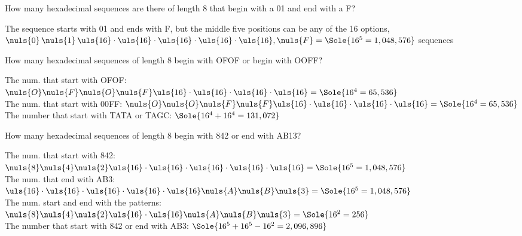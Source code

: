\begin{questions}
 How many hexadecimal sequences are there of length 8 that begin with a 01 and end with a F?
    \ifprintanswers
        \vspace{-10pt}
   \fi
    \begin{solution}
    The sequence starts with 01 and ends with F, but the middle five positions can be any of the 16 options,
    $ \nuls{0}\, \nuls{1}\, \uls{16} \cdot \uls{16} \cdot 
      \uls{16} \cdot \uls{16} \cdot \uls{16}, \nuls{F} =  
      \Sole{ 16^{5} = 1,048,576 } $ sequences
    \end{solution}



 How many hexadecimal sequences of length 8 begin with OFOF or begin with OOFF?
    \ifprintanswers
        \vspace{-15pt}
    \fi
    \begin{solution}
    The num. that start with OFOF: 
    $ \nuls{O} \nuls{F} \nuls{O} \nuls{F} 
      \uls{16} \cdot \uls{16} \cdot \uls{16} \cdot \uls{16} = 
      \Sole{ 16^4 = 65,536 }$ \\
    The num. that start with 00FF: 
    $\nuls{O} \nuls{O} \nuls{F} \nuls{F} 
      \uls{16} \cdot \uls{16} \cdot \uls{16} \cdot \uls{16} = 
      \Sole{  16^4 = 65,536 }$ \\[3pt]
    The number that start with TATA or TAGC: 
    $ \Sole{ 16^4 + 16^4 = 131,072 }$
    \end{solution}



 How many hexadecimal sequences of length 8 begin with 842 or end with AB13?
    \ifprintanswers
        \vspace{-10pt}
   \fi
    \begin{solution}
    The num. that start with 842: 
    $ \nuls{8} \nuls{4} \nuls{2} \uls{16} \cdot 
      \uls{16} \cdot \uls{16} \cdot \uls{16} \cdot \uls{16}
       = \Sole{ 16^5 = 1,048,576 }$ \\
    The num. that end with AB3: 
    $\uls{16} \cdot \uls{16} \cdot \uls{16} \cdot \uls{16} \cdot
     \uls{16} \nuls{A} \nuls{B} \nuls{3} 
       = \Sole{ 16^5 = 1,048,576 }$ \\
    The num. start and end with the patterns: 
    $ \nuls{8} \nuls{4} \nuls{2} \uls{16} \cdot 
      \uls{16} \nuls{A} \nuls{B} \nuls{3} 
      = \Sole{ 16^2 = 256}$ \\[3pt]
    The number that start with 842 or end with AB3: $ \Sole{ 16^5 + 16^5 - 16^2 = 2,096,896}$
    \end{solution}



\end{questions}
